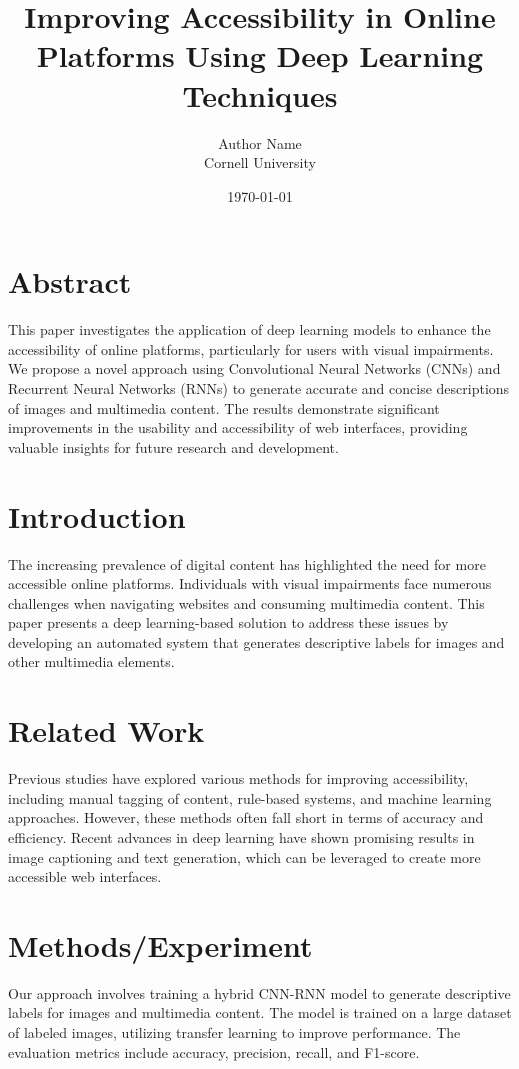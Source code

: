 \documentclass{article}
\title{Improving Accessibility in Online Platforms Using Deep Learning Techniques}
\author{Author Name \\ Cornell University}
\date{\today}
\begin{document}
\maketitle

\section{Abstract}
This paper investigates the application of deep learning models to enhance the accessibility of online platforms, particularly for users with visual impairments. We propose a novel approach using Convolutional Neural Networks (CNNs) and Recurrent Neural Networks (RNNs) to generate accurate and concise descriptions of images and multimedia content. The results demonstrate significant improvements in the usability and accessibility of web interfaces, providing valuable insights for future research and development.

\section{Introduction}
The increasing prevalence of digital content has highlighted the need for more accessible online platforms. Individuals with visual impairments face numerous challenges when navigating websites and consuming multimedia content. This paper presents a deep learning-based solution to address these issues by developing an automated system that generates descriptive labels for images and other multimedia elements.

\section{Related Work}
Previous studies have explored various methods for improving accessibility, including manual tagging of content, rule-based systems, and machine learning approaches. However, these methods often fall short in terms of accuracy and efficiency. Recent advances in deep learning have shown promising results in image captioning and text generation, which can be leveraged to create more accessible web interfaces.

\section{Methods/Experiment}
Our approach involves training a hybrid CNN-RNN model to generate descriptive labels for images and multimedia content. The model is trained on a large dataset of labeled images, utilizing transfer learning to improve performance. The evaluation metrics include accuracy, precision, recall, and F1-score.
\end{document}

